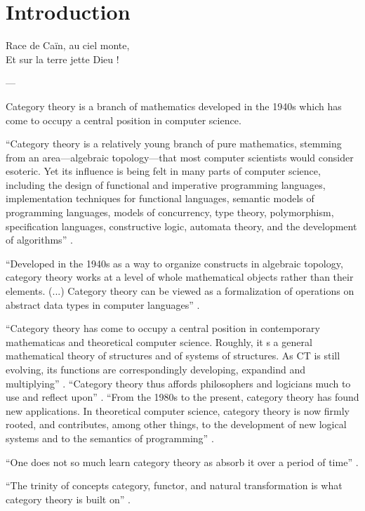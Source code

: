 \chapter{Introduction}

\epigraph{
  Race de Caïn, au ciel monte,\\
  Et sur la terre jette Dieu !
}{---\textcite[16]{baudelaire-1857}}


\parencite{goguen-1991}

Category theory is a branch of mathematics developed in the 1940s
which has come to occupy a central position in computer science.


``Category theory is a relatively young branch of pure mathematics,
stemming from an area---algebraic topology---that most computer
scientists would consider esoteric. Yet its influence is being felt in
many parts of computer science, including the design of functional and
imperative programming languages, implementation techniques for
functional languages, semantic models of programming languages, models
of concurrency, type theory, polymorphism, specification languages,
constructive logic, automata theory, and the development of
algorithms'' \parencite[xi]{pierce-1991}.


``Developed in the 1940s as a way to organize constructs in algebraic
topology, category theory works at a level of whole mathematical
objects rather than their elements. (...) Category theory can be
viewed as a formalization of operations on abstract data types in
computer languages'' \parencite[1154]{wolfram-2002}.

``Category theory has come to occupy a central position in
contemporary mathematicas and theoretical computer science. Roughly,
it s a general mathematical theory of structures and of systems of
structures. As CT is still evolving, its functions are correspondingly
developing, expandind and multiplying'' \parencite[1]{marquis-2013}.
``Category theory thus affords philosophers and logicians much to use
and reflect upon'' \parencite[1]{marquis-2013}. ``From the 1980s to
the present, category theory has found new applications. In
theoretical computer science, category theory is now firmly rooted,
and contributes, among other things, to the development of new logical
systems and to the semantics of programming''
\parencite[23]{marquis-2013}.

``One does not so much learn category theory as absorb it over a
period of time'' \parencite[26]{bird-demoor-1997}.

``The trinity of concepts category, functor, and natural
transformation is what category theory is built on''
\parencite{nlab-category-theory}.

